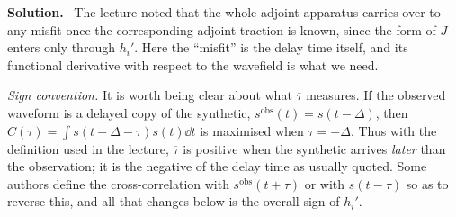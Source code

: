 \documentclass[a4paper,12pt]{paper}
\newenvironment{solution}{\par\noindent\textbf{Solution.}\ }{\par\medskip}
\begin{document}
\begin{solution}
The lecture noted that the whole adjoint apparatus carries over to any misfit once the corresponding adjoint traction is known,
since the form of $J$ enters only through $h_{i}'$. Here the ``misfit'' is the delay time itself, and its functional derivative
with respect to the wavefield is what we need.

\emph{Sign convention.} It is worth being clear about what $\overline{\tau}$ measures. If the observed waveform is a delayed
copy of the synthetic, $s^{\mathrm{obs}}(t)=s(t-\Delta)$, then $C(\tau)=\int s(t-\Delta-\tau)s(t)\dd t$ is maximised when
$\tau=-\Delta$. Thus with the definition used in the lecture, $\overline{\tau}$ is positive when the synthetic arrives
\emph{later} than the observation; it is the negative of the delay time as usually quoted. Some authors define the
cross-correlation with $s^{\mathrm{obs}}(t+\tau)$ or with $s(t-\tau)$ so as to reverse this, and all that changes below is the
overall sign of $h_{i}'$.


\end{solution}
\end{document}
